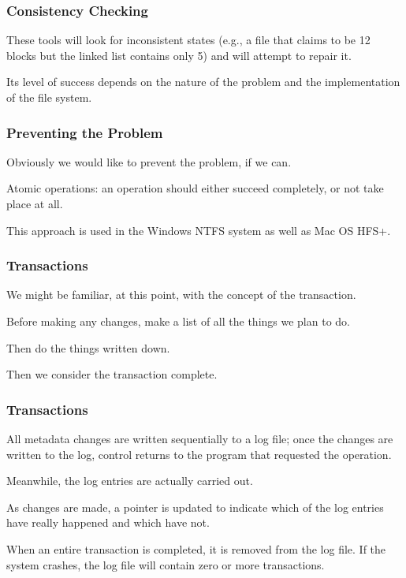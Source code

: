 \begin{frame}
\frametitle{Consistency Checking}

These tools will look for inconsistent states (e.g., a file that claims to be 12 blocks but the linked list contains only 5) and will attempt to repair it.

Its level of success depends on the nature of the problem and the implementation of the file system.

\end{frame}



\begin{frame}
\frametitle{Preventing the Problem}

Obviously we would like to prevent the problem, if we can. 

Atomic operations: an operation should either succeed completely, or not take place at all. 

This approach is used in the Windows NTFS system as well as Mac OS HFS+.


\end{frame}

\begin{frame}
\frametitle{Transactions}

We might be familiar, at this point, with the concept of the \alert{transaction}.

Before making any changes, make a list of all the things we plan to do. 

Then do the things written down. 

Then we consider the transaction complete.

\end{frame}

\begin{frame}
\frametitle{Transactions}

All metadata changes are written sequentially to a log file; once the changes are written to the log, control returns to the program that requested the operation. 

Meanwhile, the log entries are actually carried out. 

As changes are made, a pointer is updated to indicate which of the log entries have really happened and which have not.

When an entire transaction is completed, it is removed from the log file. If the system crashes, the log file will contain zero or more transactions.
\end{frame}


